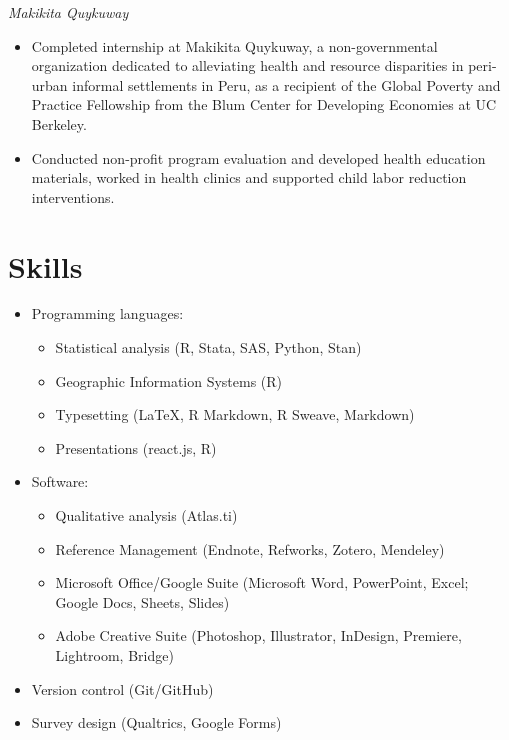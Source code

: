 \documentclass{cv_style}
\begin{document}
\textit{Makikita Quykuway}
\begin{itemize}
    \item Completed internship at Makikita Quykuway, a non-governmental organization dedicated to alleviating health and resource disparities in peri-urban informal settlements in Peru, as a recipient of the Global Poverty and Practice Fellowship from the Blum Center for Developing Economies at UC Berkeley.
    \item \parskip 1pt Conducted non-profit program evaluation and developed health education materials, worked in health clinics and supported child labor reduction interventions.
\end{itemize}


\section{Skills}
\begin{itemize}
    \item Programming languages: 
    \begin{itemize}
        \item Statistical analysis (R, Stata, SAS, Python, Stan)
        \item \parskip 1pt Geographic Information Systems (R)
        \item \parskip 1pt Typesetting (\LaTeX, R Markdown, R Sweave, Markdown) 
        \item \parskip 1pt Presentations (react.js, R) 
    \end{itemize}
    \item \parskip 1pt Software: 
    \begin{itemize}
        \item \parskip 1pt Qualitative analysis (Atlas.ti)
        \item \parskip 1pt Reference Management (Endnote, Refworks, Zotero, Mendeley)
        \item \parskip 1pt Microsoft Office/Google Suite (Microsoft Word, PowerPoint, Excel; Google Docs, Sheets, Slides)
        \item \parskip 1pt Adobe Creative Suite (Photoshop, Illustrator, InDesign, Premiere, Lightroom, Bridge)
    \end{itemize}
    \item \parskip 1pt Version control (Git/GitHub)
    \item \parskip 1pt Survey design (Qualtrics, Google Forms)
\end{itemize}
\end{document}
